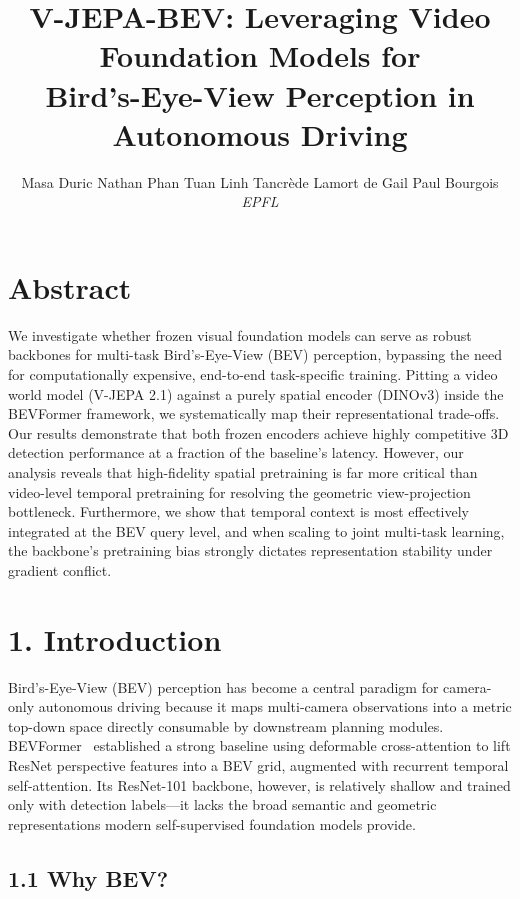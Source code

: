 \documentclass[12pt]{article}
\title{\textbf{V-JEPA-BEV: Leveraging Video Foundation Models for\\Bird's-Eye-View Perception in Autonomous Driving}}
\author{Masa Duric \quad Nathan Phan Tuan Linh \quad Tancrède Lamort de Gail \quad Paul Bourgois \\ \textit{EPFL}}
\date{}
\begin{document}
\maketitle

\section{Abstract}
We investigate whether frozen visual foundation models can serve as robust backbones for multi-task Bird's-Eye-View (BEV) perception, bypassing the need for computationally expensive, end-to-end task-specific training. Pitting a video world model (V-JEPA 2.1) against a purely spatial encoder (DINOv3) inside the BEVFormer framework, we systematically map their representational trade-offs. Our results demonstrate that both frozen encoders achieve highly competitive 3D detection performance at a fraction of the baseline's latency. However, our analysis reveals that high-fidelity spatial pretraining is far more critical than video-level temporal pretraining for resolving the geometric view-projection bottleneck. Furthermore, we show that temporal context is most effectively integrated at the BEV query level, and when scaling to joint multi-task learning, the backbone's pretraining bias strongly dictates representation stability under gradient conflict.

\section{1. Introduction}

Bird's-Eye-View (BEV) perception has become a central paradigm for camera-only autonomous driving because it maps multi-camera observations into a metric top-down space directly consumable by downstream planning modules. BEVFormer~\cite{bevformer} established a strong baseline using deformable cross-attention to lift ResNet perspective features into a BEV grid, augmented with recurrent temporal self-attention. Its ResNet-101 backbone, however, is relatively shallow and trained only with detection labels---it lacks the broad semantic and geometric representations modern self-supervised foundation models provide.

\subsection{1.1 Why BEV?}
\end{document}

